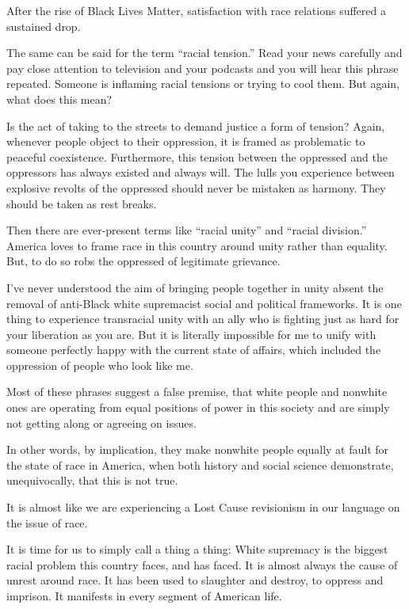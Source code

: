 After the rise of Black Lives Matter, satisfaction with race relations
suffered a sustained drop.

The same can be said for the term ``racial tension.'' Read your news
carefully and pay close attention to television and your podcasts and
you will hear this phrase repeated. Someone is inflaming racial tensions
or trying to cool them. But again, what does this mean?

Is the act of taking to the streets to demand justice a form of tension?
Again, whenever people object to their oppression, it is framed as
problematic to peaceful coexistence. Furthermore, this tension between
the oppressed and the oppressors has always existed and always will. The
lulls you experience between explosive revolts of the oppressed should
never be mistaken as harmony. They should be taken as rest breaks.

Then there are ever-present terms like ``racial unity'' and ``racial
division.'' America loves to frame race in this country around unity
rather than equality. But, to do so robs the oppressed of legitimate
grievance.

I've never understood the aim of bringing people together in unity
absent the removal of anti-Black white supremacist social and political
frameworks. It is one thing to experience transracial unity with an ally
who is fighting just as hard for your liberation as you are. But it is
literally impossible for me to unify with someone perfectly happy with
the current state of affairs, which included the oppression of people
who look like me.

Most of these phrases suggest a false premise, that white people and
nonwhite ones are operating from equal positions of power in this
society and are simply not getting along or agreeing on issues.

In other words, by implication, they make nonwhite people equally at
fault for the state of race in America, when both history and social
science demonstrate, unequivocally, that this is not true.

It is almost like we are experiencing a Lost Cause revisionism in our
language on the issue of race.

It is time for us to simply call a thing a thing: White supremacy is the
biggest racial problem this country faces, and has faced. It is almost
always the cause of unrest around race. It has been used to slaughter
and destroy, to oppress and imprison. It manifests in every segment of
American life.

